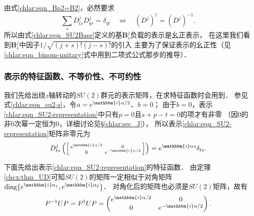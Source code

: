 由式\eqref{chlar:eqn_Bp2=B2}，必然要求
\begin{equation}
	\sum_s D^{j}_{ts} \overline{D^{j}_{qs}} = \delta_{qt}
	\quad \Leftrightarrow \quad	(D^{j})^{\dagger} = (D^{j})^{-1} .
\end{equation}
所以由式\eqref{chlar:eqn_SU2Base}定义的基$\boldsymbol{B}^{j}_{s}$负载的表示是幺正表示，
在这里我们看到$\boldsymbol{B}^{j}_{s}$中因子$1/\sqrt{(j+s)!(j-s)!}$的引入
主要为了保证表示的幺正性（见\eqref{chlar:eqn_binom-unitary}式中用到二项式公式那步的推导）．

\subsubsection{表示的特征函数、不等价性、不可约性}

我们先给出绕$z$轴转动的$SU(2)$群元的表示矩阵，在求特征函数时会用到．
参见式\eqref{chlar:eqn_su2-z}，令$a=e^{\mathbbm{i}\alpha/2}$、$b=0$；
由于$b = 0$，表示\eqref{chlar:eqn_SU2-representation}中只有$p=0$且$s+p-t=0$的项才有非零
（因$0$的非$0$次幂一定恒为$0$，详细讨论见\S\ref{chlar:sec_J}），
所以表示\eqref{chlar:eqn_SU2-representation}矩阵非零元为
\begin{equation}\label{chlar:eqn_Ddiag}
	D^{j}_{ts}\left( \left[\begin{smallmatrix}
		e^{\mathbbm{i}\alpha/2} &0 \\ 0 & e^{-\mathbbm{i}\alpha/2}
	\end{smallmatrix}\right]\right) =  e^{\mathbbm{i}\alpha s} \delta_{ts} .
\end{equation} 



下面先给出表示\eqref{chlar:eqn_SU2-representation}的特征函数．
由定理\ref{chcx:thm_UD}可知$SU(2)$的矩阵一定相似于对角矩阵
${\rm diag}\{e^{\mathbbm{i}\alpha_1},e^{\mathbbm{i}\alpha_2}\}$．
对角化后的矩阵也必须是$SU(2)$矩阵，故有
\begin{equation}\label{chlar:eqn_su2diag}
	P^{-1} U P =P^{\dagger} U P= \begin{pmatrix}
		e^{\mathbbm{i}\alpha/2} &0 \\ 0 & e^{-\mathbbm{i}\alpha/2}
	\end{pmatrix} .
\end{equation}




